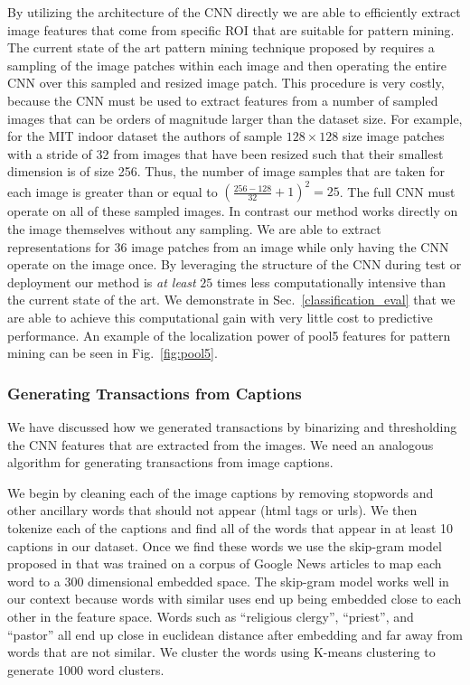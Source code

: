 \documentclass[10pt,twocolumn,letterpaper]{article}
\begin{document}
{By utilizing the architecture of the CNN directly we are able to efficiently extract image features that come from specific ROI that are suitable for pattern mining.
The current state of the art pattern mining technique proposed by \cite{LiLSH15CVPR} requires a sampling of the image patches within each image and then operating the entire CNN over this sampled and resized image patch.
This procedure is very costly, because the CNN must be used to extract features from a number of sampled images that can be orders of magnitude larger than the dataset size.
For example, for the MIT indoor dataset the authors of \cite{LiLSH15CVPR} sample $128 \times 128$ size image patches with a stride of 32 from images that have been resized such that their smallest dimension is of size 256.
Thus, the number of image samples that are taken for each image is greater than or equal to $(\frac{256 - 128}{32} + 1)^2 = 25$.
The full CNN must operate on all of these sampled images.
In contrast our method works directly on the image themselves without any sampling.
We are able to extract representations for 36 image patches from an image while only having the CNN operate on the image once.
By leveraging the structure of the CNN during test or deployment our method is {\it at least} $25$ times less computationally intensive than the current state of the art.
We demonstrate in Sec.~\ref{classification_eval} that we are able to achieve this computational gain with very little cost to predictive performance.
An example of the localization power of pool5 features for pattern mining can be seen in Fig.~\ref{fig:pool5}.

\subsubsection{Generating Transactions from Captions}
We have discussed how we generated transactions by binarizing and thresholding the CNN features that are extracted from the images.
We need an analogous algorithm for generating transactions from image captions.

We begin by cleaning each of the image captions by removing stopwords and other ancillary words that should not appear (html tags or urls).
We then tokenize each of the captions and find all of the words that appear in at least 10 captions in our dataset.
Once we find these words we use the skip-gram model proposed in \cite{DBLP:journals/corr/MikolovSCCD13} that was trained on a corpus of Google News articles to map each word to a 300 dimensional embedded space.
The skip-gram model works well in our context because words with similar uses end up being embedded close to each other in the feature space.
Words such as ``religious clergy'', ``priest'', and ``pastor'' all end up close in euclidean distance after embedding and far away from words that are not similar.
We cluster the words using K-means clustering to generate 1000 word clusters.

}
\end{document}
